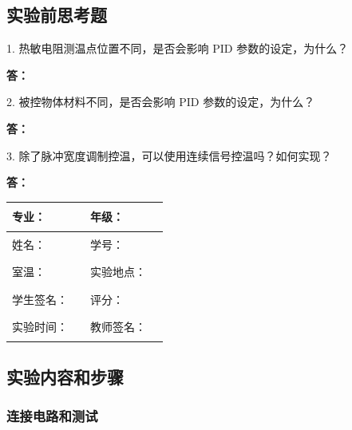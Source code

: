 \documentclass[dvipsnames, svgnames,a4paper,11pt]{article}
\newcommand{\answerblank}[1][3.8cm]{%
  \par\nopagebreak[4]\noindent\textbf{答：}\par\nopagebreak[4]\vspace*{#1}}
\begin{document}
\subsection{实验前思考题}
\begin{question}
	1. 热敏电阻测温点位置不同，是否会影响 PID 参数的设定，为什么？
\end{question}
\answerblank[3.8cm]

\begin{question}
	2. 被控物体材料不同，是否会影响 PID 参数的设定，为什么？
\end{question}
\answerblank[3.8cm]

\begin{question}
	3. 除了脉冲宽度调制控温，可以使用连续信号控温吗？如何实现？
\end{question}
\answerblank[3.8cm]

\clearpage
\begin{table}
	\renewcommand\arraystretch{1.7}
	\centering
	\begin{tabularx}{\textwidth}{|X|X|X|X|}
	\hline
	专业：& \rule{2.5cm}{0.4pt} &年级：& \rule{2.5cm}{0.4pt} \\
	\hline
	姓名： &\rule{2.5cm}{0.4pt} & 学号：&\rule{3cm}{0.4pt}\\
	\hline
	室温：& \rule{2.5cm}{0.4pt} & 实验地点： & \rule{2.5cm}{0.4pt} \\
	\hline
	学生签名：&\rule{2.5cm}{0.4pt} & 评分： &\\
	\hline
	实验时间：& \rule{3cm}{0.4pt} & 教师签名：& \rule{3cm}{0.4pt} \\
	\hline
	\end{tabularx}
\end{table}


\subsection{实验内容和步骤}

\subsubsection{连接电路和测试}
\end{document}
